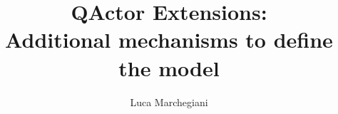 \documentclass[12pt,a4paper]{article}
\title{\textbf{QActor Extensions:\\Additional mechanisms to define the model}}
\author{Luca Marchegiani}
\begin{document}
	\maketitle
	\tableofcontents
	
	
	
	
	
	
	
	\appendix
	\appendixpage
	
	
	
	
\end{document}
